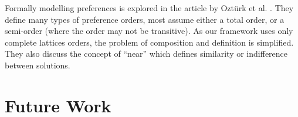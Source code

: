 Formally modelling preferences is explored in the article by Ozt\"urk et al. \cite{Ozturk}.
They define many types of preference orders, most assume either a total order, or a semi-order (where the order may not be transitive).
As our framework uses only complete lattices orders, the problem of composition and definition is simplified. 
They also discuss the concept of ``near'' which defines similarity or indifference between solutions.

\section{Future Work}

